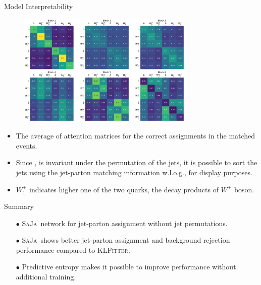 \begin{frame}[fragile]{Model Interpretability}
  \begin{figure}
    \centering
    \includegraphics[width=0.75\textwidth]{fig/attention-matrix/attention_tt_mg5_pythia8_alljets_dR-0.30_test_delphys_minmax_jet-shape_correct.pdf}
  \end{figure}
  
  {\footnotesize
    \begin{itemize}
      \item The average of attention matrices for the correct assignments in the matched \ttbar events.
      \item Since \saja, is invariant under the permutation of the jets,
            it is possible to sort the jets using the jet-parton matching information w.l.o.g., for display purposes.
      \item $W_{1}^{+}$ indicates higher \pt one of the two quarks, the decay products of $W^{+}$ boson.
    \end{itemize}
  }
\end{frame}

\begin{frame}[fragile]{Summary}
  \begin{itemize}
    \item[$\bullet$] \textsc{SaJa}\, network for jet-parton assignment without jet permutations.
    \item[$\bullet$] \textsc{SaJa}\, shows better jet-parton assignment and background rejection performance compared to \textsc{KLFitter}.
    \item[$\bullet$] Predictive entropy makes it possible to improve performance without additional training.
  \end{itemize}
\end{frame}
